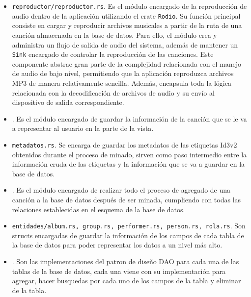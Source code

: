 \documentclass[12pt]{article}
\begin{document}
\begin{itemize}
      \item \texttt{reproductor/reproductor.rs}. Es el módulo encargado de la reproducción de audio dentro de la aplicación utilizando el crate \texttt{Rodio}. Su función principal consiste en cargar y reproducir archivos musicales a partir de la ruta de una canción almacenada en la base de datos. Para ello, el módulo crea y administra un flujo de salida de audio del sistema, además de mantener un \texttt{Sink} encargado de controlar la reproducción de las canciones. Este componente abstrae gran parte de la complejidad relacionada con el manejo de audio de bajo nivel, permitiendo que la aplicación reproduzca archivos MP3 de manera relativamente sencilla. Además, encapsula toda la lógica relacionada con la decodificación de archivos de audio y su envío al dispositivo de salida correspondiente.

      \item \texttt{}. Es el módulo encargado de guardar la información de la canción que se le va a representar al usuario en la parte de la vista.

      \item \texttt{metadatos.rs}. Se encarga de guardar los metadatos de las etiquetas Id3v2 obtenidos durante el proceso de minado, sirven como paso intermedio entre la información cruda de las etiquetas y la información que se va a guardar en la base de datos.

      \item \texttt{}. Es el módulo encargado de realizar todo el proceso de agregado de una canción a la base de datos después de ser minada, cumpliendo con todas las relaciones establecidas en el esquema de la base de datos.

      \item \texttt{entidades/album.rs, group.rs, performer.rs, person.rs, rola.rs}. Son structs encargadas de guardar la información de los campos de cada tabla de la base de datos para poder representar los datos a un nivel más alto.

      \item \texttt{}. Son las implementaciones del patron de diseño DAO para cada una de las tablas de la base de datos, cada una viene con su implementación para agregar, hacer busquedas por cada uno de los campos de la tabla y eliminar de la tabla.

      
\end{itemize}
\end{document}
